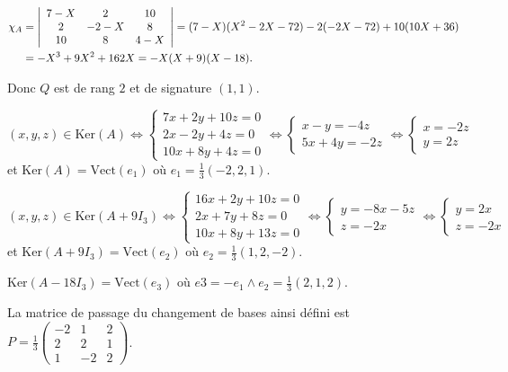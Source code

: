 {\begin{enumerate}
{\begin{align*}\ensuremath
\chi_A&=\left|
\begin{array}{ccc}
7-X&2&10\\
2&-2-X&8\\
10&8&4-X
\end{array}
\right|= (7-X)(X^2-2X-72) - 2(-2X-72) + 10(10X+36)\\
 &= -X^3+9X^2+162X= -X(X+9)(X-18) .
\end{align*}

Donc $Q$ est de rang $2$ et de signature $(1,1)$.

$(x,y,z)\in\text{Ker}(A)\Leftrightarrow\left\{
\begin{array}{l}
7x+2y+10z=0\\
2x-2y+4z=0\\
10x+8y+4z=0
\end{array}
\right.\Leftrightarrow\left\{
\begin{array}{l}
x-y=-4z\\
5x+4y=-2z
\end{array}
\right.\Leftrightarrow\left\{
\begin{array}{l}
x=-2z\\
y=2z
\end{array}
\right.$ et $\text{Ker}(A)=\text{Vect}(e_1)$ où $e_1=\frac{1}{3}(-2,2,1)$.
  

$(x,y,z)\in\text{Ker}(A+9I_3)\Leftrightarrow\left\{
\begin{array}{l}
16x+2y+10z=0\\
2x+7y+8z=0\\
10x+8y+13z=0
\end{array}
\right.\Leftrightarrow\left\{
\begin{array}{l}
y=-8x-5z\\
z=-2x
\end{array}
\right.\Leftrightarrow\left\{
\begin{array}{l}
y=2x\\
z=-2x
\end{array}
\right.$  et $\text{Ker}(A+9I_3)=\text{Vect}(e_2)$ où $e_2 =\frac{1}{3}(1,2,-2)$.

$\text{Ker}(A-18I_3) =\text{Vect}(e_3)$ où $e3 =-e_1\wedge e_2 =\frac{1}{3}(2,1,2)$.

La matrice de passage du changement de bases ainsi défini est $P =\frac{1}{3}\left(
\begin{array}{ccc}
-2&1&2\\
2&2&1\\
1&-2&2
\end{array}
\right)$.

}
\end{enumerate}}
